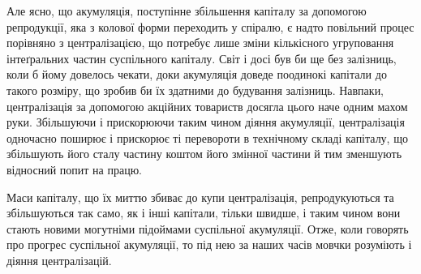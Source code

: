 Але ясно, що акумуляція, поступінне збільшення капіталу
за допомогою репродукції, яка з колової форми переходить у
спіралю, є надто повільний процес порівняно з централізацією,
що потребує лише зміни кількісного угруповання інтеґральних
частин суспільного капіталу. Світ і досі був би ще без залізниць,
коли б йому довелось чекати, доки акумуляція доведе поодинокі
капітали до такого розміру, що зробив би їх здатними до будування
залізниць. Навпаки, централізація за допомогою акційних
товариств досягла цього наче одним махом руки. Збільшуючи
і прискорюючи таким чином діяння акумуляції, централізація
одночасно поширює і прискорює ті перевороти в технічному
складі капіталу, що збільшують його сталу частину коштом його
змінної частини й тим зменшують відносний попит на працю.

Маси капіталу, що їх миттю збиває до купи централізація,
репродукуються та збільшуються так само, як і інші капітали,
тільки швидше, і таким чином вони стають новими могутніми
підоймами суспільної акумуляції. Отже, коли говорять про прогрес
суспільної акумуляції, то під нею за наших часів мовчки
розуміють і діяння централізацій.

